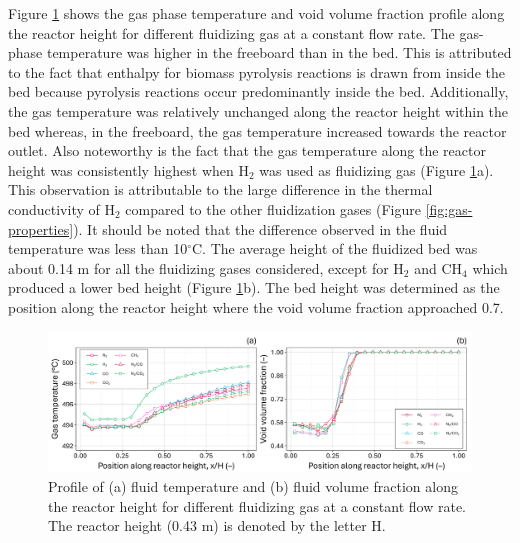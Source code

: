 \documentclass{article}
\begin{document}
Figure \ref{fig:cfd-temp-void-biooil} shows the gas phase temperature and void volume fraction profile along the reactor height for different fluidizing gas at a constant flow rate. The gas-phase temperature was higher in the freeboard than in the bed. This is attributed to the fact that enthalpy for biomass pyrolysis reactions is drawn from inside the bed because pyrolysis reactions occur predominantly inside the bed. Additionally, the gas temperature was relatively unchanged along the reactor height within the bed whereas, in the freeboard, the gas temperature increased towards the reactor outlet. Also noteworthy is the fact that the gas temperature along the reactor height was consistently highest when H$_2$ was used as fluidizing gas (Figure \ref{fig:cfd-temp-void-biooil}a). This observation is attributable to the large difference in the thermal conductivity of H$_2$ compared to the other fluidization gases (Figure \ref{fig:gas-properties}). It should be noted that the difference observed in the fluid temperature was less than 10$^{\circ}$C. The average height of the fluidized bed was about 0.14 m for all the fluidizing gases considered, except for H$_2$ and CH$_4$ which produced a lower bed height (Figure \ref{fig:cfd-temp-void-biooil}b). The bed height was determined as the position along the reactor height where the void volume fraction approached 0.7.

\begin{figure}[H]
    \centering
    \includegraphics[width=1.0\textwidth]{figures/cfd-temp-void-biooil.pdf}
    \caption{Profile of (a) fluid temperature and (b) fluid volume fraction along the reactor height for different fluidizing gas at a constant flow rate. The reactor height (0.43 m) is denoted by the letter H.}
    \label{fig:cfd-temp-void-biooil}
\end{figure}
\end{document}
